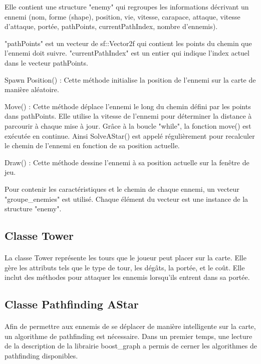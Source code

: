 Elle contient une structure "enemy" qui regroupes les informations décrivant un ennemi (nom, forme (shape), position, vie, vitesse, carapace, attaque, vitesse d'attaque, portée, pathPoints, currentPathIndex, nombre d'ennemis).


"pathPoints" est un vecteur de sf::Vector2f qui contient les points du chemin que l'ennemi doit suivre. "currentPathIndex" est un entier qui indique l'index actuel dans le vecteur pathPoints.


Spawn Position() : Cette méthode initialise la position de l'ennemi sur la carte de manière aléatoire.

Move() : Cette méthode déplace l'ennemi le long du chemin défini par les points dans pathPoints. Elle utilise la vitesse de l'ennemi pour déterminer la distance à parcourir à chaque mise à jour.
Grâce à la boucle "while", la fonction move() est exécutée en continue. Ainsi SolveAStar() est appelé régulièrement pour recalculer le chemin de l'ennemi en fonction de sa position actuelle.


Draw() : Cette méthode dessine l'ennemi à sa position actuelle sur la fenêtre de jeu.


Pour contenir les caractéristiques et le chemin de chaque ennemi, un vecteur "groupe\_enemies" est utilisé. Chaque élément du vecteur est une instance de la structure "enemy".


\subsection{Classe Tower}
\paragraph{}

La classe Tower représente les tours que le joueur peut placer sur la carte. Elle gère les attributs tels que le type de tour, les dégâts, la portée, et le coût. Elle inclut des méthodes pour attaquer les ennemis lorsqu'ils entrent dans sa portée.


\subsection{Classe Pathfinding AStar}
\paragraph{}

Afin de permettre aux ennemis de se déplacer de manière intelligente sur la carte, un algorithme de pathfinding est nécessaire.
Dans un premier temps, une lecture de la description de la librairie boost_graph a permis de cerner les algorithmes de pathfinding disponibles.

